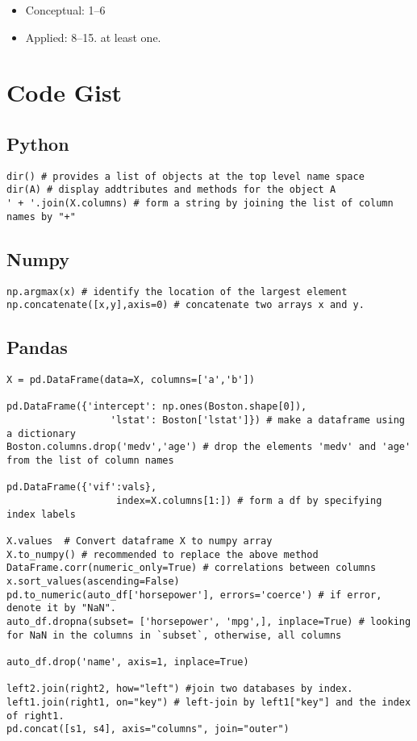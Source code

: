\documentclass[
  letterpaper,
  DIV=11,
  numbers=noendperiod]{scrreprt}
\providecommand{\tightlist}{%
  \setlength{\itemsep}{0pt}\setlength{\parskip}{0pt}}\usepackage{longtable,booktabs,array}
\begin{document}
\begin{itemize}
\tightlist
\item
  Conceptual: 1--6
\item
  Applied: 8--15. at least one.
\end{itemize}

\section{Code Gist}\label{code-gist-1}

\subsection{Python}\label{python-1}

\begin{verbatim}
dir() # provides a list of objects at the top level name space
dir(A) # display addtributes and methods for the object A
' + '.join(X.columns) # form a string by joining the list of column names by "+"
\end{verbatim}

\subsection{Numpy}\label{numpy-1}

\begin{verbatim}
np.argmax(x) # identify the location of the largest element
np.concatenate([x,y],axis=0) # concatenate two arrays x and y. 
\end{verbatim}

\subsection{Pandas}\label{pandas-1}

\begin{verbatim}
X = pd.DataFrame(data=X, columns=['a','b'])

pd.DataFrame({'intercept': np.ones(Boston.shape[0]),
                  'lstat': Boston['lstat']}) # make a dataframe using a dictionary
Boston.columns.drop('medv','age') # drop the elements 'medv' and 'age' from the list of column names

pd.DataFrame({'vif':vals},
                   index=X.columns[1:]) # form a df by specifying index labels

X.values  # Convert dataframe X to numpy array
X.to_numpy() # recommended to replace the above method
DataFrame.corr(numeric_only=True) # correlations between columns 
x.sort_values(ascending=False)
pd.to_numeric(auto_df['horsepower'], errors='coerce') # if error, denote it by "NaN".
auto_df.dropna(subset= ['horsepower', 'mpg',], inplace=True) # looking for NaN in the columns in `subset`, otherwise, all columns

auto_df.drop('name', axis=1, inplace=True)

left2.join(right2, how="left") #join two databases by index. 
left1.join(right1, on="key") # left-join by left1["key"] and the index of right1. 
pd.concat([s1, s4], axis="columns", join="outer")
\end{verbatim}
\end{document}
